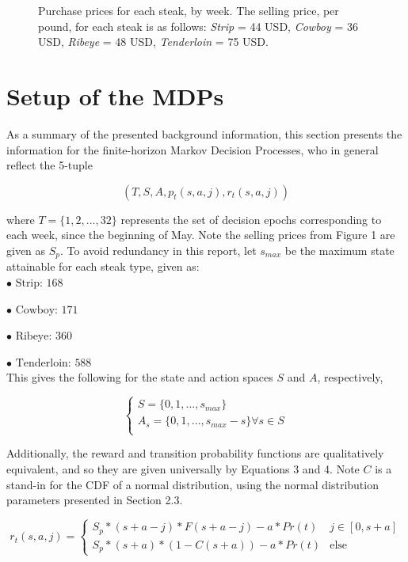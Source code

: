 \documentclass[12pt,a4paper]{article}
\begin{document}
\begin{figure}[H]
\caption{Purchase prices for each steak, by week. The selling price, per pound, for each steak is as follows: \textit{Strip} = 44 USD, \textit{Cowboy} = 36 USD, \textit{Ribeye} = 48 USD, \textit{Tenderloin} = 75 USD.}
\end{figure}

\section{Setup of the MDPs}

As a summary of the presented background information, this section presents the information for the finite-horizon Markov Decision Processes, who in general reflect the 5-tuple

$$(T, S, A, p_{t}(s,a,j), r_{t}(s,a,j)) $$

where $T = \{1,2,...,32\}$ represents the set of decision epochs corresponding to each week, since the beginning of May. Note the selling prices from Figure 1 are given as $S_{p}$. To avoid redundancy in this report, let $s_{max}$ be the maximum state attainable for each steak type, given as:
\\

$ \bullet \text{ Strip: } 168  $

$ \bullet \text{ Cowboy: } 171  $

$ \bullet \text{ Ribeye: } 360  $

$ \bullet \text{ Tenderloin: } 588  $
\\

This gives the following for the state and action spaces $S$ and $A$, respectively,

$$\begin{cases}
S = \{0, 1, ..., s_{max} \} \\
A_{s} = \{0, 1, ..., s_{max} - s \} \forall s \in S \\
\end{cases}$$

Additionally, the reward and transition probability functions are qualitatively equivalent, and so they are given universally by Equations 3 and 4. Note $C$ is a stand-in for the CDF of a normal distribution, using the normal distribution parameters presented in Section 2.3.

\small
\begin{equation} \label{3}
r_{t}(s,a,j) = \begin{cases} S_{p} *(s + a - j) * F(s + a - j) - a*Pr(t) & j \in [0,s+a] \\ S_{p} *(s + a) * (1 -  C(s + a)) - a*Pr(t) & \text{else} \end{cases} 
\end{equation}
\end{document}
